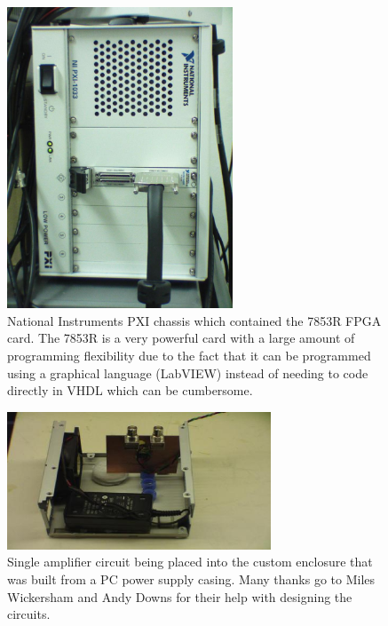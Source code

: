 \begin{figure}[ht!]
\centering
\includegraphics[width=0.6\textwidth]{eps_pics/fpgaCard}
\caption{National Instruments PXI chassis which contained the 7853R FPGA card. The 7853R is a very powerful card with a large amount of programming flexibility due to the fact that it can be programmed using a graphical language (LabVIEW) instead of needing to code directly in VHDL which can be cumbersome.
	 \label{fig:fpgaCard}} 
\end{figure}

\begin{figure}[ht!]
\centering
\includegraphics[width=0.7\textwidth]{eps_pics/oneAmp}
\caption{Single amplifier circuit being placed into the custom enclosure that was built from a PC power supply casing. Many thanks go to Miles Wickersham and Andy Downs for their help with designing the circuits.
	 \label{fig:oneAmp}} 
\end{figure}

